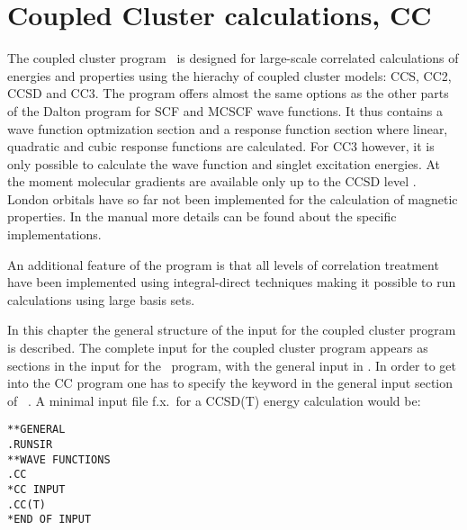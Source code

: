 \chapter{Coupled Cluster calculations, CC}\label{ch:CC}

The coupled cluster program \cc\ is designed for large-scale
correlated calculations of energies and properties using the
hierachy of coupled cluster models: CCS, CC2, CCSD and CC3.
The program offers almost the same options as the other
parts of the Dalton program for SCF and MCSCF wave functions.
It thus contains a wave function optmization section and 
a response function section
where linear, quadratic and cubic response functions are calculated.
For CC3 however, it is only possible to calculate the wave function and 
singlet excitation energies. 
At the moment molecular gradients are available 
only up to the CCSD level .  
London orbitals have so far not been implemented 
for the calculation of magnetic properties.
In the manual more details can be found about the specific implementations.

An additional feature of the program is that all levels of correlation
treatment have been implemented using integral-direct techniques making
it possible to run calculations using large basis sets.  

In this chapter the general structure of the input for the
coupled cluster program is described.
The complete input for the coupled cluster program appears as
sections in the input for the \sir\ program, with the general
input in . In order to get into the CC program
one has to specify the  keyword in the general input
section of \sir\ . A minimal
input file f.x.\ for a CCSD(T) energy calculation would be:
\begin{verbatim}
**GENERAL
.RUNSIR
**WAVE FUNCTIONS
.CC
*CC INPUT
.CC(T)
*END OF INPUT
\end{verbatim}

